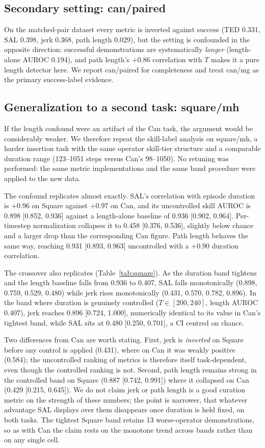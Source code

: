 \documentclass{article}
\begin{document}
\subsection{Secondary setting: can/paired}

On the matched-pair dataset every metric is inverted against success (TED
0.331, SAL 0.398, jerk 0.368, path length 0.029), but the setting is
confounded in the opposite direction: successful demonstrations are
systematically \emph{longer} (length-alone AUROC 0.194), and path length's
$+0.86$ correlation with $T$ makes it a pure length detector here. We
report can/paired for completeness and treat can/mg as the primary
success-label evidence.

\subsection{Generalization to a second task: square/mh}
\label{sec:square}

If the length confound were an artifact of the Can task, the argument would
be considerably weaker. We therefore repeat the skill-label analysis on
square/mh, a harder insertion task with the same operator skill-tier
structure and a comparable duration range (123--1051 steps versus Can's
98--1050). No retuning was performed: the same metric implementations and
the same band procedure were applied to the new data.

The confound replicates almost exactly. SAL's correlation with episode
duration is $+0.96$ on Square against $+0.97$ on Can, and its uncontrolled
skill AUROC is 0.898 [0.852, 0.936] against a length-alone baseline of 0.936
[0.902, 0.964]. Per-timestep normalization collapses it to 0.458 [0.376,
0.536], slightly below chance and a larger drop than the corresponding Can
figure. Path length behaves the same way, reaching 0.931 [0.893, 0.963]
uncontrolled with a $+0.90$ duration correlation.

The crossover also replicates (Table~\ref{tab:square}). As the duration band
tightens and the length baseline falls from 0.936 to 0.407, SAL falls
monotonically (0.898, 0.759, 0.529, 0.480) while jerk rises monotonically
(0.431, 0.570, 0.782, 0.896). In the band where duration is genuinely
controlled ($T \in [200,240]$, length AUROC 0.407), jerk reaches 0.896
[0.724, 1.000], numerically identical to its value in Can's tightest band,
while SAL sits at 0.480 [0.250, 0.701], a CI centred on chance.

Two differences from Can are worth stating. First, jerk is \emph{inverted}
on Square before any control is applied (0.431), where on Can it was weakly
positive (0.584); the uncontrolled ranking of metrics is therefore itself
task-dependent, even though the controlled ranking is not. Second, path
length remains strong in the controlled band on Square (0.887 [0.742,
0.991]) where it collapsed on Can (0.429 [0.215, 0.645]). We do not claim
jerk or path length is a good curation metric on the strength of these
numbers; the point is narrower, that whatever advantage SAL displays over
them disappears once duration is held fixed, on both tasks. The tightest
Square band retains 13 worse-operator demonstrations, so as with Can the
claim rests on the monotone trend across bands rather than on any single
cell.
\end{document}
